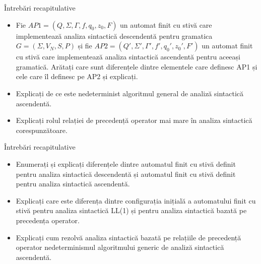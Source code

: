 \documentclass[pdf]{beamer}
\begin{document}
\begin{frame}{Întrebări recapitulative}
\begin{itemize}
\item
Fie $AP1=(Q, \Sigma, \Gamma, f, q_0, z_0, F)$ un automat finit cu stivă care implementează analiza sintactică descendentă pentru gramatica $G=(\Sigma, V_N, S, P)$ și fie $AP2=(Q', \Sigma ', \Gamma ', f', q_0 ', z_0 ', F')$ un automat finit cu stivă care implementează analiza sintactică ascendentă pentru aceeași gramatică. Arătați care sunt diferențele dintre elementele care definesc AP1 și cele care îl definesc pe AP2 și explicați.
\newline

\item
Explicați de ce este nedeterminist algoritmul general de analiză sintactică ascendentă.
\newline

\item
Explicați rolul relației de precedență operator mai mare în analiza sintactică corespunzătoare.

\end{itemize}
\end{frame}



\begin{frame}{Întrebări recapitulative}
\begin{itemize}
\item
Enumerați și explicați diferențele dintre automatul finit cu stivă definit pentru analiza sintactică descendentă și automatul finit cu stivă definit pentru analiza sintactică ascendentă.
\newline

\item
Explicați care este diferența dintre configurația inițială a automatului finit cu stivă pentru analiza sintactică LL(1) și pentru analiza sintactică bazată pe precedența operator.
\newline

\item
Explicați cum rezolvă analiza sintactică bazată pe relațiile de precedență operator nedeterminismul algoritmului generic de analiză sintactică ascendentă.
\newline

\end{itemize}
\end{frame}
\end{document}
